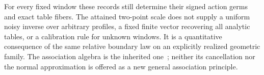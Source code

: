 For every fixed window these records still determine their signed action
germs and exact table fibers.  The attained two-point scale does not
supply a uniform noisy inverse over arbitrary profiles, a fixed finite
vector recovering all analytic tables, or a calibration rule for unknown
windows.  It is a quantitative consequence of the same relative boundary
law on an explicitly realized geometric family.  The association algebra
is the inherited one~\cite{Osius2009}; neither its cancellation nor the
normal approximation is offered as a new general association principle.
